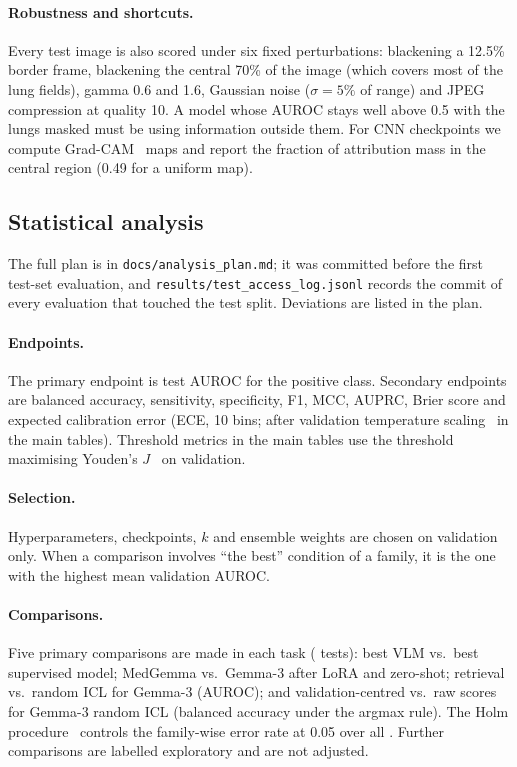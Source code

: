 \documentclass[11pt]{article}
\begin{document}
\paragraph{Robustness and shortcuts.} Every test image is also scored under six fixed
perturbations: blackening a 12.5\% border frame, blackening the central 70\% of the image
(which covers most of the lung fields), gamma 0.6 and 1.6, Gaussian noise ($\sigma=5\%$ of
range) and JPEG compression at quality 10. A model whose AUROC stays well above 0.5 with the
lungs masked must be using information outside them. For CNN checkpoints we compute
Grad-CAM~\citep{selvaraju2017gradcam} maps and report the fraction of attribution mass in the
central region (0.49 for a uniform map).

\subsection{Statistical analysis}\label{sec:stats}

The full plan is in \texttt{docs/analysis\_plan.md}; it was committed before the first test-set
evaluation, and \texttt{results/test\_access\_log.jsonl} records the commit of every evaluation
that touched the test split. Deviations are listed in the plan.

\paragraph{Endpoints.} The primary endpoint is test AUROC for the positive class. Secondary
endpoints are balanced accuracy, sensitivity, specificity, F1, MCC, AUPRC, Brier score and
expected calibration error (ECE, 10 bins; after validation temperature
scaling~\citep{guo2017calibration} in the main tables). Threshold metrics in the main tables use
the threshold maximising Youden's $J$~\citep{youden1950index} on validation.

\paragraph{Selection.} Hyperparameters, checkpoints, $k$ and ensemble weights are chosen on
validation only. When a comparison involves ``the best'' condition of a family, it is the one
with the highest mean validation AUROC.

\paragraph{Comparisons.} Five primary comparisons are made in each task (\NPrimaryTests{} tests):
best VLM vs.\ best supervised model; MedGemma vs.\ Gemma-3 after LoRA and zero-shot; retrieval
vs.\ random ICL for Gemma-3 (AUROC); and validation-centred vs.\ raw scores for Gemma-3 random
ICL (balanced accuracy under the argmax rule). The Holm procedure~\citep{holm1979simple} controls
the family-wise error rate at 0.05 over all \NPrimaryTests{}. Further comparisons are labelled
exploratory and are not adjusted.
\end{document}
